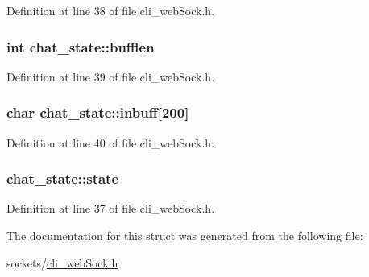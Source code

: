 Definition at line 38 of file cli\_\-webSock.h.

\hypertarget{structchat__state_aaf15c3058b1e28fa18ae5e18392f0c48}{
\subsubsection[{bufflen}]{\setlength{\rightskip}{0pt plus 5cm}int {\bf chat\_\-state::bufflen}}}
\label{structchat__state_aaf15c3058b1e28fa18ae5e18392f0c48}


Definition at line 39 of file cli\_\-webSock.h.

\hypertarget{structchat__state_adea205d568097f74d166ecdfdafd170c}{
\subsubsection[{inbuff}]{\setlength{\rightskip}{0pt plus 5cm}char {\bf chat\_\-state::inbuff}\mbox{[}200\mbox{]}}}
\label{structchat__state_adea205d568097f74d166ecdfdafd170c}


Definition at line 40 of file cli\_\-webSock.h.

\hypertarget{structchat__state_ace3128c5cfad854aece0a133ef9d54f0}{
\subsubsection[{state}]{ {\bf chat\_\-state::state}}}
\label{structchat__state_ace3128c5cfad854aece0a133ef9d54f0}


Definition at line 37 of file cli\_\-webSock.h.



The documentation for this struct was generated from the following file:\begin{DoxyCompactItemize}
\item 
sockets/\hyperlink{cli__webSock_8h}{cli\_\-webSock.h}\end{DoxyCompactItemize}
